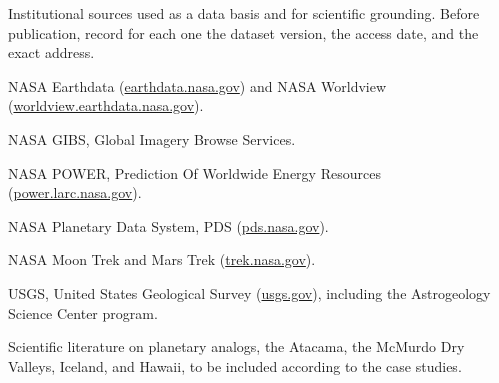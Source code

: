 \documentclass[12pt,letterpaper]{article}
\begin{document}
Institutional sources used as a data basis and for scientific grounding. Before publication, record for each one the dataset version, the access date, and the exact address.

\begin{enumerate}[label={[\arabic*]}]
  \item NASA Earthdata (\url{earthdata.nasa.gov}) and NASA Worldview (\url{worldview.earthdata.nasa.gov}).
  \item NASA GIBS, Global Imagery Browse Services.
  \item NASA POWER, Prediction Of Worldwide Energy Resources (\url{power.larc.nasa.gov}).
  \item NASA Planetary Data System, PDS (\url{pds.nasa.gov}).
  \item NASA Moon Trek and Mars Trek (\url{trek.nasa.gov}).
  \item USGS, United States Geological Survey (\url{usgs.gov}), including the Astrogeology Science Center program.
  \item Scientific literature on planetary analogs, the Atacama, the McMurdo Dry Valleys, Iceland, and Hawaii, to be included according to the case studies.
\end{enumerate}
\end{document}
